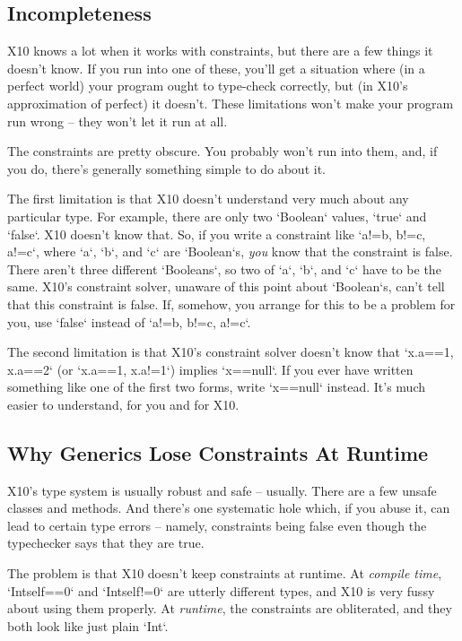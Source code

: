 \subsection{Incompleteness}

X10 knows a lot when it works with constraints, but there are a few things it
doesn't know.  If you run into one of these, you'll get a situation where (in
a perfect world) your program ought to type-check correctly, but (in X10's
approximation of perfect)  it doesn't.  These limitations won't make your
program run wrong -- they won't let it run at all.

The constraints are pretty obscure.  You probably won't run into them, and, if
you do, there's generally something simple to do about it.

The first limitation is that X10 doesn't understand very much about any
particular type.  For example, there are only two \xcd`Boolean` values,
\xcd`true` and \xcd`false`.  X10 doesn't know that.  So, if you write a
constraint like \xcd`{a!=b, b!=c, a!=c}`, where \xcd`a`, \xcd`b`, and \xcd`c`
are \xcd`Boolean`s, {\em you} know that the constraint is false.  There aren't
three different \xcd`Booleans`, so two of \xcd`a`, \xcd`b`, and \xcd`c` have
to be the same.  X10's constraint solver, unaware of this point about
\xcd`Boolean`s, can't tell that this constraint is false. 
If, somehow, you arrange for this to be a problem for you, use \xcd`false`
instead of 
\xcd`{a!=b, b!=c, a!=c}`.

The second limitation is that X10's constraint solver doesn't know that
\xcd`{x.a==1, x.a==2}` (or \xcd`{x.a==1, x.a!=1}`) implies \xcd`x==null`.
If you ever have written something like one of the first two forms, write
\xcd`x==null` instead.  It's much easier to understand, for you and for X10.


\subsection{Why Generics Lose Constraints At Runtime}

X10's type system is usually robust and safe -- usually.  There are a few
unsafe classes and methods.  And there's one systematic hole which, if you
abuse it, can lead to certain type errors -- namely, constraints being false
even though the typechecker says that they are true.

The problem is that X10 doesn't keep constraints at runtime.  
At {\em compile time}, \xcd`Int{self==0}` and \xcd`Int{self!=0}` are utterly
different types, and X10 is very fussy about using them properly.  At {\em
runtime}, the constraints are obliterated, and they both look like just plain
\xcd`Int`.  


